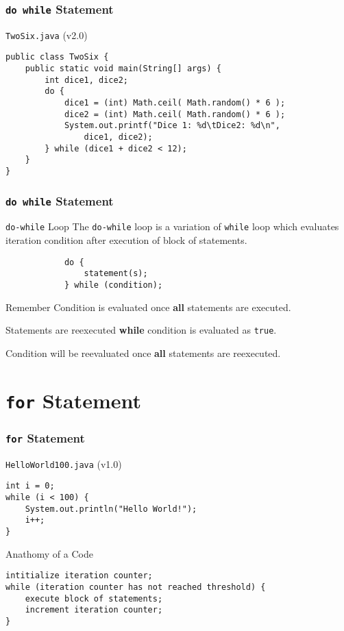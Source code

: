 \documentclass[10pt, compress]{beamer}
\begin{document}
\begin{frame}[fragile]
	\frametitle{\texttt{do while} Statement}
	\begin{block}{\texttt{TwoSix.java} (v2.0)}
		\begin{verbatim}
public class TwoSix {
	public static void main(String[] args) {
		int dice1, dice2;
		do {
			dice1 = (int) Math.ceil( Math.random() * 6 );
			dice2 = (int) Math.ceil( Math.random() * 6 );
			System.out.printf("Dice 1: %d\tDice2: %d\n",
				dice1, dice2);
		} while (dice1 + dice2 < 12);
	}
}
		\end{verbatim}
	\end{block}
\end{frame}

\begin{frame}[fragile]
	\frametitle{\texttt{do while} Statement}
	\begin{block}{\texttt{do-while} Loop}
		The \texttt{do-while} loop is a variation of \texttt{while} loop which evaluates iteration condition after execution of block of statements.
		\begin{verbatim}
			do {
				statement(s);
			} while (condition);
		\end{verbatim}
	\end{block}
	\begin{block}{Remember}
		Condition is evaluated once \textbf{all} statements are executed.

		Statements are reexecuted \textbf{while} condition is evaluated as \texttt{true}.

		Condition will be reevaluated once \textbf{all} statements are reexecuted.
	\end{block}
\end{frame}

\section{\texttt{for} Statement}

\begin{frame}[fragile]
	\frametitle{\texttt{for} Statement}
	\begin{block}{\texttt{HelloWorld100.java} (v1.0)}
		\begin{verbatim}
int i = 0;
while (i < 100) {
	System.out.println("Hello World!");
	i++;
}
		\end{verbatim}
	\end{block}
	\begin{block}{Anathomy of a Code}
		\begin{verbatim}
intitialize iteration counter;
while (iteration counter has not reached threshold) {
	execute block of statements;
	increment iteration counter;
}
		\end{verbatim}
	\end{block}
\end{frame}
\end{document}
